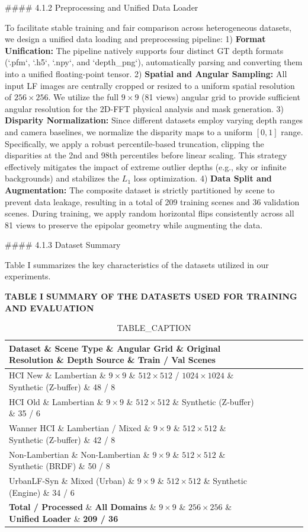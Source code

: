 \documentclass[journal]{IEEEtran}
\begin{document}
\#\#\#\# 4.1.2 Preprocessing and Unified Data Loader

To facilitate stable training and fair comparison across heterogeneous datasets, we design a unified data loading and preprocessing pipeline:
1) \textbf{Format Unification:} The pipeline natively supports four distinct GT depth formats (`.pfm`, `.h5`, `.npy`, and `depth_png`), automatically parsing and converting them into a unified floating-point tensor.
2) \textbf{Spatial and Angular Sampling:} All input LF images are centrally cropped or resized to a uniform spatial resolution of $256 \times 256$. We utilize the full $9 \times 9$ (81 views) angular grid to provide sufficient angular resolution for the 2D-FFT physical analysis and mask generation.
3) \textbf{Disparity Normalization:} Since different datasets employ varying depth ranges and camera baselines, we normalize the disparity maps to a uniform $[0, 1]$ range. Specifically, we apply a robust percentile-based truncation, clipping the disparities at the 2nd and 98th percentiles before linear scaling. This strategy effectively mitigates the impact of extreme outlier depths (e.g., sky or infinite backgrounds) and stabilizes the $L_1$ loss optimization.
4) \textbf{Data Split and Augmentation:} The composite dataset is strictly partitioned by scene to prevent data leakage, resulting in a total of 209 training scenes and 36 validation scenes. During training, we apply random horizontal flips consistently across all 81 views to preserve the epipolar geometry while augmenting the data.

\#\#\#\# 4.1.3 Dataset Summary

Table I summarizes the key characteristics of the datasets utilized in our experiments.

\textbf{TABLE I}
\textbf{SUMMARY OF THE DATASETS USED FOR TRAINING AND EVALUATION}

\begin{table}[htbp]
\centering
\caption{TABLE_CAPTION}
\begin{tabular}{llllll}
\toprule
Dataset \& Scene Type \& Angular Grid \& Original Resolution \& Depth Source \& Train / Val Scenes \\
\midrule
HCI New \& Lambertian \& $9 \times 9$ \& $512 \times 512$ / $1024 \times 1024$ \& Synthetic (Z-buffer) \& 48 / 8 \\
HCI Old \& Lambertian \& $9 \times 9$ \& $512 \times 512$ \& Synthetic (Z-buffer) \& 35 / 6 \\
Wanner HCI \& Lambertian / Mixed \& $9 \times 9$ \& $512 \times 512$ \& Synthetic (Z-buffer) \& 42 / 8 \\
Non-Lambertian \& Non-Lambertian \& $9 \times 9$ \& $512 \times 512$ \& Synthetic (BRDF) \& 50 / 8 \\
UrbanLF-Syn \& Mixed (Urban) \& $9 \times 9$ \& $512 \times 512$ \& Synthetic (Engine) \& 34 / 6 \\
\textbf{Total / Processed} \& \textbf{All Domains} \& \textbf{$9 \times 9$} \& \textbf{$256 \times 256$} \& \textbf{Unified Loader} \& \textbf{209 / 36} \\
\bottomrule
\end{tabular}
\end{table}
\end{document}
